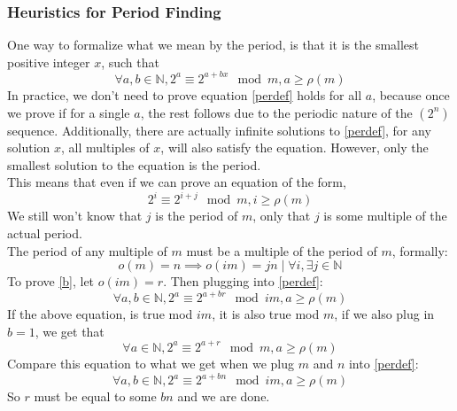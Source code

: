 \documentclass{article}
\begin{document}
  \subsubsection{Heuristics for Period Finding}
  One way to formalize what we mean by the period, is that it is the smallest positive integer $x$, such that
  \begin{equation}\label{perdef}
    \forall a, b \in \mathbb{N}, 2^a \equiv 2^{a+bx} \mod m, a \geq \rho(m)
  \end{equation}
  In practice, we don't need to prove equation \eqref{perdef} holds for all $a$, because once we prove if for a single $a$, the rest follows due to the periodic nature of the $(2^n)$ sequence. Additionally, there are actually infinite solutions to \eqref{perdef}, for any solution $x$, all multiples of $x$, will also satisfy the equation. However, only the smallest solution to the equation is the period.\\
  
  This means that even if we can prove an equation of the form,
  \begin{equation}\label{a}
    2^i \equiv 2^{i+j} \mod m, i \geq \rho(m)
  \end{equation}
  We still won't know that $j$ is the period of $m$, only that $j$ is some multiple of the actual period.\\
  
  The period of any multiple of $m$ must be a multiple of the period of $m$, formally:
  \begin{equation}\label{b}
    o(m) = n \implies o(im) = jn \mid \forall i, \exists j \in \mathbb{N}
  \end{equation}
  To prove \eqref{b}, let $o(im) = r$. Then plugging into \eqref{perdef}:
  \begin{equation}
    \forall a, b \in \mathbb{N}, 2^a \equiv 2^{a+br} \mod im, a \geq \rho(m)
  \end{equation}
  If the above equation, is true mod $im$, it is also true mod $m$, if we also plug in $b=1$, we get that
  \begin{equation}
    \forall a \in \mathbb{N}, 2^a \equiv 2^{a+r} \mod m, a \geq \rho(m)
  \end{equation}
  Compare this equation to what we get when we plug $m$ and $n$ into \eqref{perdef}:
  \begin{equation}
    \forall a, b \in \mathbb{N}, 2^a \equiv 2^{a+bn} \mod im, a \geq \rho(m)
  \end{equation}
  So $r$ must be equal to some $bn$ and we are done.\\
\end{document}
